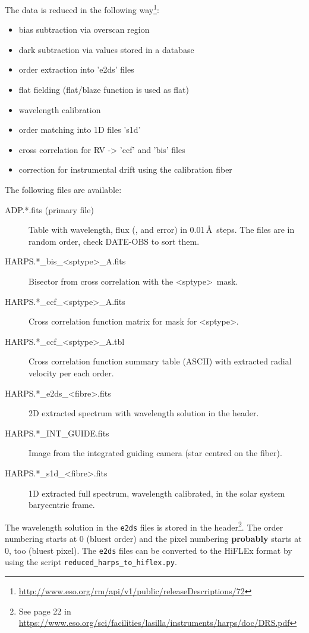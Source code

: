 \documentclass[10pt,a4paper]{article}
\begin{document}
The data is reduced in the following way\footnote{\url{http://www.eso.org/rm/api/v1/public/releaseDescriptions/72}}:
\begin{itemize}\setlength\itemsep{0em}
  \item bias subtraction via overscan region
  \item dark subtraction via values stored in a database
  \item order extraction into 'e2ds' files
  \item flat fielding (flat/blaze function is used as flat)
  \item wavelength calibration
  \item order matching into 1D files 's1d'
  \item cross correlation for RV -> 'ccf' and 'bis' files
  \item correction for instrumental drift using the calibration fiber
\end{itemize}

The following files are available:
\begin{description}
  \item[ADP.*.fits (primary file)] Table with wavelength, flux (, and error) in 0.01\,\AA\ steps. The files are in random order, check DATE-OBS to sort them.
  \item[HARPS.*\_bis\_\textless sptype\textgreater\_A.fits] Bisector from cross correlation with the \textless sptype\textgreater\ mask.
  \item[HARPS.*\_ccf\_\textless sptype\textgreater\_A.fits] Cross correlation function matrix for mask for \textless sptype\textgreater.
  \item[HARPS.*\_ccf\_\textless sptype\textgreater\_A.tbl]  Cross correlation function summary table (ASCII) with extracted radial velocity per each order.
  \item[HARPS.*\_e2ds\_\textless fibre\textgreater.fits] 2D extracted spectrum with wavelength solution in the header.
  \item[HARPS.*\_INT\_GUIDE.fits] Image from the integrated guiding camera (star centred on the fiber).
  \item[HARPS.*\_s1d\_\textless fibre\textgreater.fits] 1D extracted full spectrum, wavelength calibrated, in the solar system barycentric frame.
\end{description}

The wavelength solution in the \verb|e2ds| files is stored in the header\footnote{See page 22 in \url{https://www.eso.org/sci/facilities/lasilla/instruments/harps/doc/DRS.pdf}}. The order numbering starts at 0 (bluest order) and the pixel numbering \textbf{probably} starts at 0, too (bluest pixel). The \verb|e2ds| files can be converted to the HiFLEx format by using the script \verb|reduced_harps_to_hiflex.py|.
\end{document}
